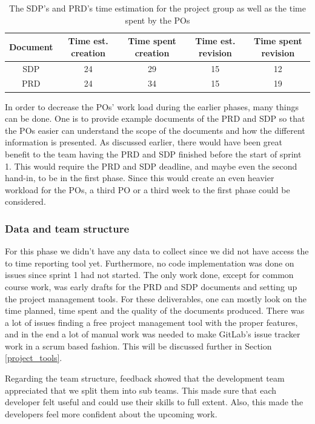 \documentclass{article}
\begin{document}
\begin{table}[h!]
    \centering
    \begin{tabular}{|c|c|c|c|c|}
    \hline
      Document & Time est. creation & Time spent creation  & Time est. revision & Time spent revision \\
      \hline \hline
      SDP & 24 & 29 & 15 & 12 \\ \hline
      PRD & 24 & 34 & 15 & 19 \\ \hline
    \end{tabular}
    \caption{The SDP's and PRD's time estimation for the project group as well as the time spent by the POs}
    \label{tab:timeDocs}
\end{table}

In order to decrease the POs' work load during the earlier phases, many things can be done. One is to provide example documents of the PRD and SDP so that the POs easier can understand the scope of the documents and how the different information is presented. As discussed earlier, there would have been great benefit to the team having the PRD and SDP finished before the start of sprint 1. This would require the PRD and SDP deadline, and maybe even the second hand-in, to be in the first phase. Since this would create an even heavier workload for the POs, a third PO or a third week to the first phase could be considered.

\subsubsection{Data and team structure}
For this phase we didn't have any data to collect since we did not have access the to time reporting tool yet. Furthermore, no code implementation was done on issues since sprint 1 had not started. The only work done, except for common course work, was early drafts for the PRD and SDP documents and setting up the project management tools. For these deliverables, one can mostly look on the time planned, time spent and the quality of the documents produced. There was a lot of issues finding a free project management tool with the proper features, and in the end a lot of manual work was needed to make GitLab's issue tracker work in a scrum based fashion. This will be discussed further in Section \ref{project_tools}.

Regarding the team structure, feedback showed that the development team appreciated that we split them into sub teams. This made sure that each developer felt useful and could use their skills to full extent. Also, this made the developers feel more confident about the upcoming work. 
\end{document}

